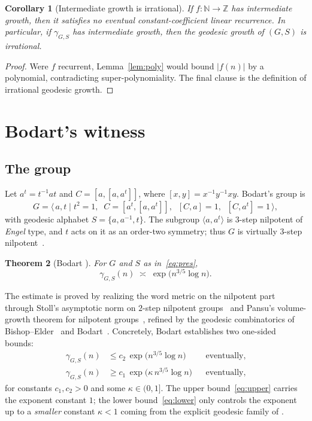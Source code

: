 \documentclass[reqno]{amsart}
\theoremstyle{plain}
\newtheorem{theorem}{Theorem}[section]
\newtheorem{corollary}[theorem]{Corollary}
\theoremstyle{definition}
\theoremstyle{remark}
\newcommand{\Z}{\mathbb{Z}}
\newcommand{\N}{\mathbb{N}}
\newcommand{\geod}{\gamma}
\begin{document}
\begin{corollary}[Intermediate growth is irrational]
\label{cor:irr}
If $f\colon\N\to\Z$ has intermediate growth, then it satisfies no eventual
constant-coefficient linear recurrence. In particular, if $\geod_{G,S}$ has intermediate growth,
then the geodesic growth of $(G,S)$ is irrational.
\end{corollary}

\begin{proof}
Were $f$ recurrent, Lemma~\ref{lem:poly} would bound $|f(n)|$ by a polynomial, contradicting
super-polynomiality. The final clause is the definition of irrational geodesic growth.
\end{proof}

\section{Bodart's witness}
\label{sec:witness}

\subsection*{The group}
Let $a^{t}=t^{-1}at$ and $C=[a,[a,a^{t}]]$, where $[x,y]=x^{-1}y^{-1}xy$. Bodart's group is
\begin{equation}\label{eq:pres}
  G=\bigl\langle\, a,t \;\big|\; t^{2}=1,\;\; C=[a^{t},[a,a^{t}]],\;\; [C,a]=1,\;\; [C,a^{t}]=1
  \,\bigr\rangle,
\end{equation}
with geodesic alphabet $S=\{a,a^{-1},t\}$. The subgroup $\langle a,a^{t}\rangle$ is $3$-step
nilpotent of \emph{Engel} type, and $t$ acts on it as an order-two symmetry; thus $G$ is virtually
$3$-step nilpotent~\cite{Bodart}.

\begin{theorem}[Bodart {\cite[Thm.~4]{Bodart}}]
\label{thm:bodart}
For $G$ and $S$ as in~\eqref{eq:pres},
\[
  \geod_{G,S}(n)\;\asymp\;\exp\!\bigl(n^{3/5}\log n\bigr).
\]
\end{theorem}

The estimate is proved by realizing the word metric on the nilpotent part through Stoll's
asymptotic norm on $2$-step nilpotent groups~\cite{Stoll} and Pansu's volume-growth theorem for
nilpotent groups~\cite{Pansu}, refined by the geodesic combinatorics of Bishop--Elder~\cite{BishopElder}
and Bodart~\cite[\S2--\S4]{Bodart}. Concretely, Bodart establishes two one-sided bounds:
\begin{align}
  \geod_{G,S}(n)&\le c_2\,\exp\!\bigl(n^{3/5}\log n\bigr) &&\text{eventually,}\label{eq:upper}\\
  \geod_{G,S}(n)&\ge c_1\,\exp\!\bigl(\kappa\, n^{3/5}\log n\bigr) &&\text{eventually,}\label{eq:lower}
\end{align}
for constants $c_1,c_2>0$ and some $\kappa\in(0,1]$. The upper bound~\eqref{eq:upper} carries the
exponent constant $1$; the lower bound~\eqref{eq:lower} only controls the exponent up to a
\emph{smaller} constant $\kappa<1$ coming from the explicit geodesic family of \cite[\S4]{Bodart}.
\end{document}
